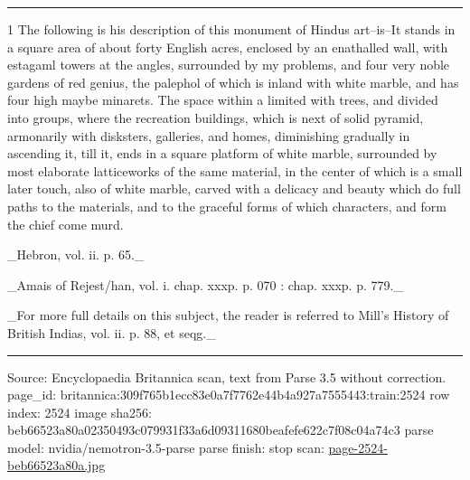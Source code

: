 \documentclass[10pt]{article}
\begin{document}
\par\vspace{4pt}\noindent\rule{0.3\linewidth}{0.4pt}\par
{\footnotesize
1 The following is his description of this monument of Hindus art--is--It stands in a square area of about forty English acres, enclosed by an enathalled wall, with estagaml towers at the angles, surrounded by my problems, and four very noble gardens of red genius, the palephol of which is inland with white marble, and has four high maybe minarets. The space within a limited with trees, and divided into groups, where the recreation buildings, which is next of solid pyramid, armonarily with disksters, galleries, and homes, diminishing gradually in ascending it, till it, ends in a square platform of white marble, surrounded by most elaborate latticeworks of the same material, in the center of which is a small later touch, also of white marble, carved with a delicacy and beauty which do full paths to the materials, and to the graceful forms of which characters, and form the chief come murd.

\_Hebron, vol. ii. p. 65.\_

\_Amais of Rejest/han, vol. i. chap. xxxp. p. 070 : chap. xxxp. p. 779.\_

\_For more full details on this subject, the reader is referred to Mill’s History of British Indias, vol. ii. p. 88, et seqg.\_\par}
\vfill\par\noindent\rule{\linewidth}{0.4pt}\par
{\scriptsize\color{gray}\noindent Source: Encyclopaedia Britannica scan, text from Parse 3.5 without correction. page\_id: britannica:309f765b1ecc83e0a7f7762e44b4a927a7555443:train:2524 \quad row index: 2524 \quad image sha256: beb66523a80a02350493c079931f33a6d09311680beafefe622c7f08c04a74c3 \quad parse model: nvidia/nemotron-3.5-parse \quad parse finish: stop \quad scan: \href{../scans/page-2524-beb66523a80a.jpg}{page-2524-beb66523a80a.jpg}\par}
\end{document}
